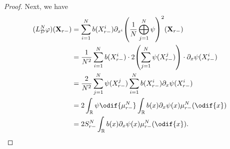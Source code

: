 \begin{proof}
  Next, we have
  \begin{equation}
    \begin{split}
      (L_{\cD}^{N} \varphi) (\bm{X}_{r-})
       & = \sum_{i=1}^N b(X_{r-}^i) \partial_{x^i}\br*{ \frac{1}{N} \bigoplus_{j=1}^N \psi }^2 (\bm{X}_{r-})               \\
       & = \frac{1}{N^2} \sum_{i=1}^N b(X_{r-}^i) \cdot 2 \br*{ \sum_{j=1}^N \psi(X_{r-}^j) } \cdot \partial_x \psi(X_{r-}^i) \\
       & = \frac{2}{N^2} \sum_{j=1}^N \psi(X_{r-}^j) \sum_{i=1}^N b(X_{r-}^i) \partial_x \psi(X_{r-}^i)                       \\
       & = 2 \int_\potspace \psi \odif{\mu_{r-}^N} \int_\potspace b(x) \partial_x \psi (x) \mu_{r-}^N(\odif{x})            \\
       & = 2 S_{r-}^N \int_\potspace b(x) \partial_x \psi (x) \mu_{r-}^N(\odif{x}).
    \end{split}
  \end{equation}


\end{proof}
